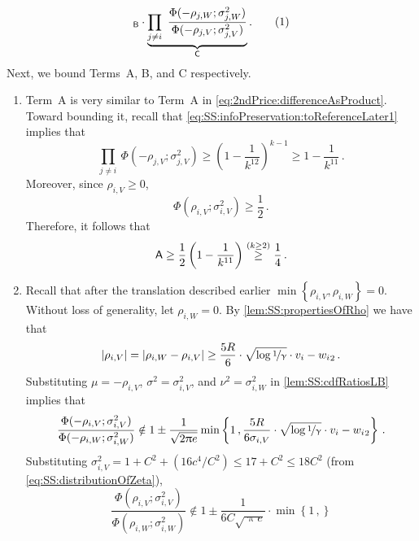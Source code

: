 \documentclass[11pt,letterpaper]{article}
\theoremstyle{plain}
\theoremstyle{definition}
\theoremstyle{remark}
\newcommand{\yesnum}{\addtocounter{equation}{1}\tag{\theequation}}
\newcommand{\Stackrel}[2]{\stackrel{\mathmakebox[\widthof{\ensuremath{#2}}]{#1}}{#2}}
\def\abs#1{\left| #1 \right|}
\newcommand{\sinparen}[1]{\ensuremath{(#1)}}
\newcommand{\inbrace}[1]{\ensuremath{\left\{#1\right\}}}
\newcommand{\inparen}[1]{\ensuremath{\left(#1\right)}}
\let\norm\relax
\newcommand{\norm}[1]{\ensuremath{\left\lVert #1 \right\rVert}}
\newcommand{\nfrac}[2]{\nicefrac{#1}{#2}}
\renewcommand{\gamma}{\upgamma}
\renewcommand{\pi}{\uppi}
\newcommand{\customcdf}[2]{\Phi\sinparen{#1; \sigma_{#2}^2}}
\begin{document}
{{\begin{align*}
{{{            }}_{\textsf{B}}
            \cdot 
            \underbrace{\prod_{j\neq i}~ \frac{
                \customcdf{-\rho_{j,W}}{j,W}
            }{
                \customcdf{-\rho_{j,V}}{j,V}
            }}_{\textsf{C}}
        }\,.
        \yesnum\label{eq:2ndPrice:differenceAsProduct}
    \end{align*}
    Next, we bound Terms~\textsf{A}, \textsf{B}, and \textsf{C} respectively.
    \begin{enumerate}
        \item Term~\textsf{A} is very similar to Term~\textsf{A} in \cref{eq:2ndPrice:differenceAsProduct}.
        Toward bounding it, recall that \cref{eq:SS:infoPreservation:toReferenceLater1} implies that 
        \[
            \prod_{j\neq i}~ \customcdf{-\rho_{j,V}}{j,V}
            \geq \inparen{1 - \frac{1}{k^{12}}}^{k-1}
            \geq 1 - \frac{1}{k^{11}}\,.
        \]
        Moreover, since $\rho_{i,V}\geq 0$,
        \[
            \customcdf{\rho_{i,V}}{i,V}
            \geq \frac{1}{2}\,.
        \]
        Therefore, it follows that 
        \[
            \textsf{A}
            \geq \frac{1}{2}\inparen{1 - \frac{1}{k^{11}}}
            ~~\Stackrel{(k\geq 2)}{\geq} ~~ \frac{1}{4}\,.
        \]
        \item Recall that after the translation described earlier $\min\inbrace{\rho_{i,V}, \rho_{i,W}}=0$.
        Without loss of generality, let $\rho_{i, W}=0$.
        By \cref{lem:SS:propertiesOfRho} we have that 
        \[
            \abs{\rho_{i, V}} = \abs{\rho_{i, W} - \rho_{i, V}}\geq \frac{5R}{6} \cdot \sqrt{\log{\nfrac{1}{\gamma}}}\cdot \norm{v_i - w_i}_2\,.
        \]
        Substituting $\mu=-\rho_{i,V}$, $\sigma^2=\sigma_{i,V}^2$, and $\nu^2=\sigma_{i,W}^2$ in \cref{lem:SS:cdfRatiosLB} implies that 
        \[
            \frac{
                \customcdf{-\rho_{i,V}}{i,V}
            }{
                \customcdf{-\rho_{i,W}}{i,W}
            }
            \notin 1 \pm \frac{1}{\sqrt{2\pi e}}
                \min\inbrace{
                    1\,, 
                    \frac{5R}{6\sigma_{i,V}} \cdot \sqrt{\log{\nfrac{1}{\gamma}}}\cdot \norm{v_i - w_i}_2
                } 
            \,.
        \]
        Substituting $\sigma_{i,V}^2=1+C^2+(16c^4/C^2)\leq 17+C^2\leq 18C^2$ (from \cref{eq:SS:distributionOfZeta}), 
        \[
            \frac{
                \customcdf{\rho_{i,V}}{i,V}
            }{
                \customcdf{\rho_{i,W}}{i,W}
            }
            \notin 1 \pm \frac{1}{6C\sqrt{\pi e}}\cdot 
                \min\inbrace{
                    1\,,
}\]
\end{enumerate}}}
\end{document}
